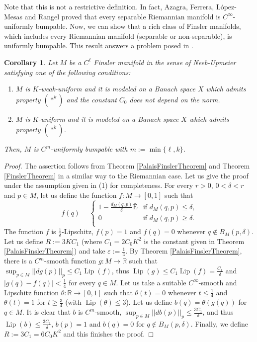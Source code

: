 \documentclass[11pt]{amsart}
\newtheorem{cor}[thm]{Corollary}
\numberwithin{equation}{section}
\begin{document}
Note that this is not a restrictive definition. In fact,  Azagra,   Ferrera,   L\'opez-Mesas and  Rangel \cite{AzFeMeRa} proved that  every separable Riemannian manifold is $C^\infty$-uniformly bumpable. Now, we can show that a rich class of Finsler manifolds, which includes  every  Riemannian manifold (separable or non-separable),  is uniformly bumpable. This result answers a problem posed in \cite{AzFeMe, AzFeMeRa, GaJaRa}.

\begin{cor}\label{approximation:uniformly}
Let $M$ be a  $C^\ell$ Finsler manifold  in the sense of  Neeb-Upmeier satisfying one of the following conditions:
\begin{enumerate}
\item $M$ is $K$-weak-uniform and it is  modeled on a Banach space $X$ which admits property $(*^k)$ and the constant $C_0$ does not depend on the norm.
\item $M$ is $K$-uniform and it is modeled on a Banach space $X$ which admits property $(*^k)$.
\end{enumerate}
Then, $M$ is $C^m$-uniformly bumpable  with $m:=\min\{\ell,k\}$.
\end{cor}
\begin{proof}
The  assertion follows from Theorem \ref{PalaisFinslerTheorem} and Theorem \ref{FinslerTheorem}
 in a similar way to the Riemannian case.
Let us give the proof under the assumption given in (1)  for completeness. For every $r>0$,  $0<\delta< r$ and $p\in M$, let us define the function $f:M\to [0,1]$ such that
\begin{equation*}
f(q)=
\begin{cases}
1-\frac{d_M(q,p)}{\delta}Ê& \text{if $d_M(q,p)\le \delta$,}\\
0 & \text{if $d_M(q,p)\ge \delta$}.\\
\end{cases}
\end{equation*}
The function $f$ is $\frac{1}{\delta}$-Lipschitz, $f(p)=1$ and $f(q)=0$ whenever $q\not\in B_M(p,\delta)$.
Let us define $R:=3KC_1$   (where $C_1=2C_0K^2$ is the constant given in  Theorem \ref{PalaisFinslerTheorem})
and take $\varepsilon:=\frac{1}{4}$. By Theorem \ref{PalaisFinslerTheorem}, there is a $C^m$-smooth function $g:M\to{\mathbb{R}}$ such that  $\sup_{p\in M}||dg(p)||_p\le C_1 {\operatorname{Lip}}(f)$,  thus  ${\operatorname{Lip}}(g)\le C_1 {\operatorname{Lip}}(f) =\frac{C_1}{\delta}$ and $|g(q)-f(q)|<\frac{1}{4}$ for every $q\in M$.
Let us take a suitable $C^\infty$-smooth and Lipschitz function $\theta:{\mathbb{R}}\to[0,1]$  such that $\theta(t)=0$ whenever $t\le \frac{1}{4}$ and $\theta(t)=1$ for $t\ge \frac{3}{4}$ (with ${\operatorname{Lip}}(\theta)\le 3$). Let us  define $b(q)=\theta(g(q))$ for $q\in M$. It is
clear that  $b$ is $C^m$-smooth, $\sup_{p\in M}||db(p)||_p\le \frac{3C_1}{\delta}$, and thus
${\operatorname{Lip}}(b)\le \frac{3C_1}{\delta}$,  $b(p)=1$ and $b(q)=0$ for $q\not\in B_M(p,\delta)$. Finally, we define
 $R:= 3C_1=6C_0K^2$ and this finishes the proof.
\end{proof}
\end{document}
